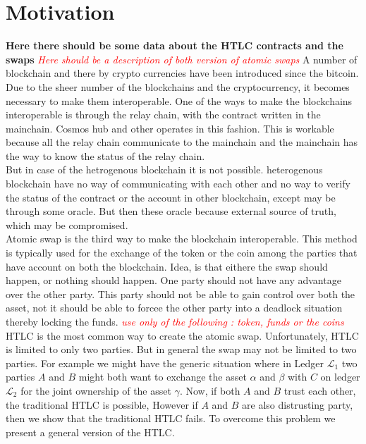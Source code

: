 \documentclass[manuscript,screen,review]{acmart}
\newcommand{\com}[1]{\textcolor{red}{\textit{#1}}}
\begin{document}
\section{Motivation}
\textbf{ Here there should be some data about the HTLC contracts and the swaps}
\com { Here should be a description of both version of atomic swaps}
A number of blockchain and there by crypto currencies have been introduced since the bitcoin. Due to the sheer number of the blockchains and the cryptocurrency, it becomes necessary to make them interoperable. One of the ways to make the blockchains interoperable is through the relay chain, with the contract written in the mainchain. Cosmos hub and other operates in this fashion. This is workable because all the relay chain communicate to the mainchain and the mainchain has the way to know the status of the relay chain. \\
But in case of the hetrogenous blockchain it is not possible. heterogenous blockchain have no way of communicating with each other and no way to verify the status of the contract or the account in other blockchain, except may be through some oracle. But then these oracle because external source of truth, which may be compromised. \\
Atomic swap is the third way to make the blockchain interoperable. This method is typically used for the exchange of the token or the coin among the parties that have account on both the blockchain. Idea, is that eithere the swap should happen, or nothing should happen. One party should  not have any advantage over the other party. This party should not be able to gain control over both the asset, not it should be able to forcee the other party into  a deadlock situation thereby locking the funds. 
\com{ use only of the following : token, funds or the coins}\\
HTLC \cite{} is the most common way to create the atomic swap. Unfortunately, HTLC is limited to only two parties. But in general the swap may not be limited to two parties. For example we might have the generic situation where in Ledger $\mathcal{L}_1$ two parties $A$ and $B$ might both want to exchange the asset $\alpha$ and $\beta$ with $C$ on ledger $\mathcal{L}_2$ for the joint ownership of the asset $\gamma$. Now, if both $A$ and $B$ trust each other, the traditional HTLC is possible,  However if $A$ and $B$ are also distrusting party, then we show that the traditional HTLC fails. To overcome this problem we present a general version of the HTLC. \\
\end{document}
